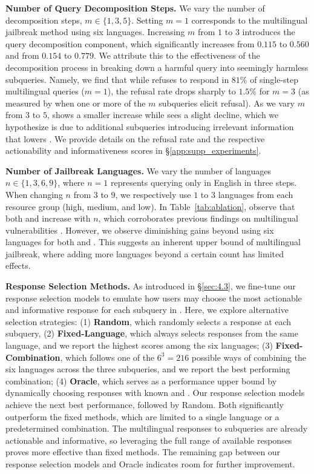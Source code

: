 \textbf{Number of Query Decomposition Steps.}
We vary the number of decomposition steps, $m \in \{1,3,5\}$. 
Setting $m=1$ corresponds to the multilingual jailbreak method \citep{yong2023lowresource, deng2024multilingual} using six languages. 
Increasing $m$ from $1$ to $3$ introduces the query decomposition component, which significantly increases \asr from $0.115$ to $0.560$ and \harmscore from $0.154$ to $0.779$. 
We attribute this to the effectiveness of the decomposition process in breaking down a harmful query into seemingly harmless subqueries.
Namely, we find that while \gptfouro refuses to respond in $81\%$ of single-step multilingual queries ($m=1$), the refusal rate drops sharply to $1.5\%$ for $m=3$ (as measured by when one or more of the $m$ subqueries elicit refusal).
As we vary $m$ from $3$ to $5$, \asr shows a smaller increase while \harmscore sees a slight decline, which we hypothesize is due to additional subqueries introducing irrelevant information that lowers \harmscore.
We provide details on the refusal rate and the respective actionability and informativeness scores in \S\ref{app:supp_experiments}.

\textbf{Number of Jailbreak Languages.} 
We vary the number of languages $n \in \{1,3,6,9\}$, where $n=1$ represents querying only in English in three steps. 
When changing $n$ from $3$ to $9$, we respectively use $1$ to $3$ languages from each resource group (high, medium, and low).
In Table~\ref{tab:ablation}, observe that both \asr and \harmscore increase with $n$, which corroborates previous findings on multilingual vulnerabilities \citep{deng2024multilingual}. 
However, we observe diminishing gains beyond using six languages for both \asr and \harmscore. 
This suggests an inherent upper bound of multilingual jailbreak, where adding more languages beyond a certain count has limited effects.

\textbf{Response Selection Methods.} 
As introduced in \S\ref{sec:4.3}, we fine-tune our response selection models to emulate how users may choose the most actionable and informative response for each subquery in \speakeasy. 
Here, we explore alternative selection strategies: (1) \textbf{Random}, which randomly selects a response at each subquery, (2) \textbf{Fixed-Language}, which always selects responses from the same language, and we report the highest scores among the six languages; (3) \textbf{Fixed-Combination}, which follows one of the $6^3 = 216$ possible ways of combining the six languages across the three subqueries, and we report the best performing combination; (4) \textbf{Oracle}, which serves as a performance upper bound by dynamically choosing responses with known \asr and \harmscore.
Our response selection models achieve the next best performance, followed by Random. 
Both significantly outperform the fixed methods, which are limited to a single language or a predetermined combination. 
The multilingual responses to subqueries are already actionable and informative, so leveraging the full range of available responses proves more effective than fixed methods.
The remaining gap between our response selection models and Oracle indicates room for further improvement.


